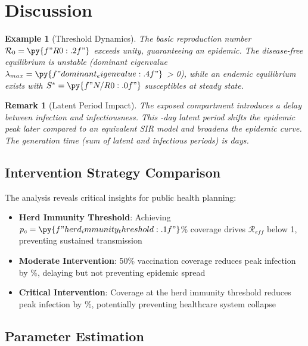 \documentclass[a4paper, 11pt]{article}
\newtheorem{example}{Example}[section]
\newtheorem{remark}{Remark}[section]
\begin{document}
\section{Discussion}

\begin{example}[Threshold Dynamics]
The basic reproduction number $\mathcal{R}_0 = \py{f"{R0:.2f}"}$ exceeds unity, guaranteeing
an epidemic. The disease-free equilibrium is unstable (dominant eigenvalue
$\lambda_{max} = \py{f"{dominant_eigenvalue:.4f}"}$ > 0), while an endemic equilibrium exists
with $S^* = \py{f"{N/R0:.0f}"}$ susceptibles at steady state.
\end{example}

\begin{remark}[Latent Period Impact]
The exposed compartment introduces a delay between infection and infectiousness. This
-day latent period shifts the epidemic peak later compared to an
equivalent SIR model and broadens the epidemic curve. The generation time (sum of latent
and infectious periods) is  days.
\end{remark}

\subsection{Intervention Strategy Comparison}

The analysis reveals critical insights for public health planning:

\begin{itemize}
\item \textbf{Herd Immunity Threshold}: Achieving $p_c = \py{f"{herd_immunity_threshold:.1f}"}$\%
coverage drives $\mathcal{R}_{eff}$ below 1, preventing sustained transmission
\item \textbf{Moderate Intervention}: 50\% vaccination coverage reduces peak infection by
$\%$, delaying but not preventing epidemic spread
\item \textbf{Critical Intervention}: Coverage at the herd immunity threshold reduces peak
infection by $\%$, potentially preventing healthcare system collapse
\end{itemize}

\subsection{Parameter Estimation}
\end{document}
